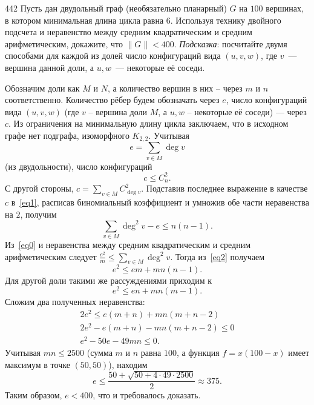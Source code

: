 \begin{task}{442}
Пусть дан двудольный граф (необязательно планарный) \(G\) на \(100\) вершинах, в котором минимальная длина цикла равна \(6\). Используя технику двойного подсчета и неравенство между средним квадратическим и средним арифметическим, докажите, что \(\|G\| < 400\). \textit{Подсказка}: посчитайте двумя способами для каждой из долей число конфигураций вида \((u,v,w)\), где \(v\)~--- вершина данной доли, а \(u,w\)~--- некоторые её соседи.
\end{task}

\begin{solution}
Обозначим доли как $M$ и $N$, а количество вершин в них -- через $m$ и $n$ соответственно. Количество рёбер будем обозначать через $e$, число конфигураций вида $(u,v,w)$ (где $v$ -- вершина доли $M$, а $u,w$ -- некоторые её соседи) --- через $c$. Из ограничения на минимальную длину цикла заключаем, что в исходном графе нет подграфа, изоморфного $K_{2,2}$. Учитывая
\begin{equation}\label{eq0}
    e=\sum_{v\in M}{\deg{v}}
\end{equation}
(из двудольности), число конфигураций \begin{equation}\label{eq1}
c \leq C_{n}^{2}.
\end{equation} С другой стороны, $c = \sum\limits_{v\in M} C_{\deg{v}}^{2}.$ Подставив последнее выражение в качестве $c$ в~\eqref{eq1}, расписав биномиальный коэффициент и умножив обе части неравенства на $2$, получим
\begin{equation}\label{eq2}
\sum_{v\in M} {\deg^2{v}} - e \leq n(n-1).
\end{equation}
Из~\eqref{eq0} и неравенства между средним квадратическим и средним арифметическим следует $\frac{e^2}{m} \leq \sum\limits_{v\in M}{\deg^2{v}}$. Тогда из~\eqref{eq2} получаем
\[ e^2 \leq em + mn(n-1).\]
Для другой доли такими же рассуждениями приходим к
\[e^2 \leq en + mn(m-1).\]
Сложим два полученных неравенства:
\begin{gather*}
2e^2 \leq e(m + n) + mn(m + n - 2) \\
2e^2 - e(m + n) - mn(m + n - 2) \leq 0 \\
e^2 - 50e - 49mn \leq 0.
\end{gather*}
Учитывая $mn \leq 2500$ (сумма $m$ и $n$ равна $100$, а функция $f=x(100-x)$ имеет максимум в точке $(50, 50)$), находим
\[ e \leq \frac{50 + \sqrt{50 + 4 \cdot 49 \cdot 2500}}{2} \approx 375. \]
Таким образом, $e < 400$, что и требовалось доказать.
\end{solution}
